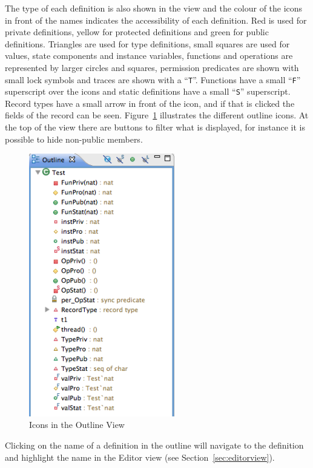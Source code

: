 \documentclass{crescendorepchap}
\begin{document}
The
type of each definition is also shown in the view and the colour of
the icons in front of the names indicates the accessibility of each
definition. Red is
used for private definitions, yellow for protected definitions and
green for public definitions. Triangles are used for
type definitions, small squares are used for values, state components
and instance variables, functions and operations are represented by
larger circles and squares, permission predicates are shown with small
lock symbols and traces are shown with a
``\texttt{T}''. Functions have a small ``\texttt{F}'' superscript over the
icons and static definitions have a small ``\texttt{S}'' superscript.
Record types have a small arrow in front of the
icon, and if that is clicked the fields of the record can be seen.
Figure~\ref{fig:OutlineIcons} illustrates the different outline icons.
At the top of the view there are buttons to filter what is displayed,
for instance it is possible to hide non-public members.

\begin{figure}[!htb]
\begin{center}
  \includegraphics[width=2.5in]{images/OutlineIcons}
  \caption[labelInTOC]{Icons in the Outline View}
  \label{fig:OutlineIcons}
\end{center}
\end{figure}

Clicking on the name of a definition in the outline will navigate to
the definition and highlight the name in the Editor view (see Section~\ref{sec:editorview}).
\end{document}
